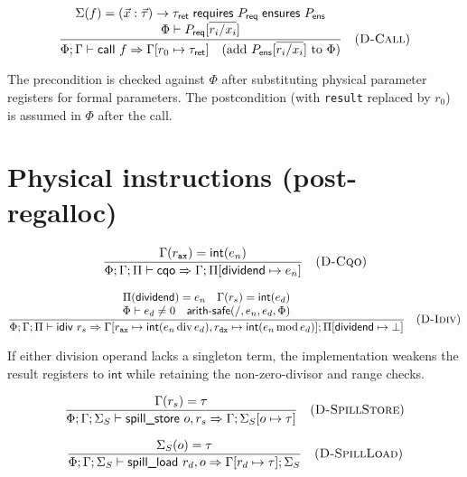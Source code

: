 $$
  \frac{
    \begin{array}{c}
      \Sigma(f) = (\vec{x}:\vec{\tau}) \rightarrow \tau_\textsf{ret} \;\textsf{requires } P_\textsf{req} \;\textsf{ensures } P_\textsf{ens} \\
      \Phi \vdash P_\textsf{req}[\overline{r_i / x_i}]
    \end{array}
  }{\Phi; \Gamma \vdash \textsf{call } f \Rightarrow \Gamma[r_0 \mapsto \tau_\textsf{ret}] \quad \text{(add } P_\textsf{ens}[\overline{r_i / x_i}] \text{ to } \Phi\text{)}} \quad (\textsc{D-Call})
$$

\noindent The precondition is checked against $\Phi$ after substituting physical parameter registers for formal parameters. The postcondition (with \texttt{result} replaced by $r_0$) is assumed in $\Phi$ after the call.

\section*{Physical instructions (post-regalloc)}

\[
  \frac{
    \Gamma(r_{\mathtt{ax}}) = \textsf{int}(e_n)
  }{
    \Phi; \Gamma; \Pi \vdash \textsf{cqo} \Rightarrow \Gamma; \Pi[\mathsf{dividend} \mapsto e_n]
  } \quad (\textsc{D-Cqo})
\]

\[
  \frac{
    \begin{array}{c}
      \Pi(\mathsf{dividend}) = e_n \quad \Gamma(r_s) = \textsf{int}(e_d) \\
      \Phi \vdash e_d \ne 0 \quad \textsf{arith-safe}(/,e_n,e_d,\Phi)
    \end{array}
  }{
    \Phi; \Gamma; \Pi \vdash \textsf{idiv } r_s \Rightarrow
    \Gamma[r_{\mathtt{ax}} \mapsto \textsf{int}(e_n \operatorname{div} e_d),
           r_{\mathtt{dx}} \mapsto \textsf{int}(e_n \operatorname{mod} e_d)];
    \Pi[\mathsf{dividend} \mapsto \bot]
  } \quad (\textsc{D-Idiv})
\]

\noindent If either division operand lacks a singleton term, the implementation weakens the result registers to $\textsf{int}$ while retaining the non-zero-divisor and range checks.

\[
  \frac{
    \Gamma(r_s) = \tau
  }{
    \Phi; \Gamma; \Sigma_S \vdash \textsf{spill\_store } o, r_s \Rightarrow \Gamma; \Sigma_S[o \mapsto \tau]
  } \quad (\textsc{D-SpillStore})
\]

\[
  \frac{
    \Sigma_S(o) = \tau
  }{
    \Phi; \Gamma; \Sigma_S \vdash \textsf{spill\_load } r_d, o \Rightarrow \Gamma[r_d \mapsto \tau]; \Sigma_S
  } \quad (\textsc{D-SpillLoad})
\]

